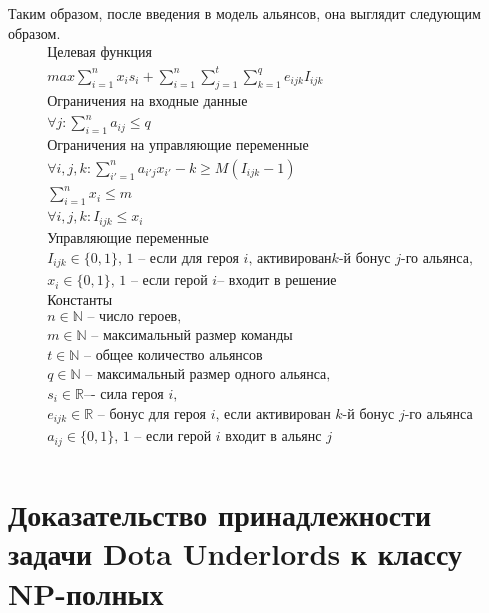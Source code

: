 \documentclass{article}
\begin{document}
Таким образом, после введения в модель альянсов, она выглядит следующим образом.
\begin{equation}
\label{eq:DUIP}
\begin{gathered}
\textbf{Целевая функция}\\
max \sum_{i=1}^{n} x_i s_i + \sum_{i=1}^{n} \sum_{j=1}^{t}  \sum_{k=1}^{q} e_{ijk} I_{ijk} \\
\textbf{Ограничения на входные данные}\\
\forall{j} : \sum_{i=1}^n a_{ij} \le q \\
\textbf{Ограничения на управляющие переменные} \\
\forall{i,j,k} :  \sum_{i'=1}^{n} a_{i'j} x_{i'} - k \ge M( I_{ijk}  - 1) \\
\sum_{i=1}^n x_i \le m   \\ 
\forall{i,j,k} :  I_{ijk}  \le x_i \\
\textbf{Управляющие переменные} \\
I_{ijk} \in \{0, 1\} \text {, 1 – если для героя } i \text{, активирован} k\text{-й бонус } j \text{-го альянса,} \\
x_i  \in \{0, 1\} \text{, 1 -- если герой } i \text{– входит в решение} \\
\textbf{Константы} \\
n \in \mathbb{N} \text{ -- число героев,} \\
m \in \mathbb{N} \text{ -- максимальный размер команды}\\
t \in \mathbb{N} \text{ -- общее количество альянсов} \\
q \in \mathbb{N} \text{ -- максимальный размер одного альянса,} \\
s_i  \in \mathbb{R} \text{–- сила героя } i, \\
e_{ijk} \in \mathbb{R} \text{ -- бонус для героя } i \text{,  если активирован } k
\text{-й бонус } j \text{-го альянса} \\
a_{ij} \in \{0, 1\} \text{, 1 -- если герой } i \text{ входит в альянс } j \\ 
\end{gathered}
\end{equation}

\section{Доказательство принадлежности задачи Dota Underlords к классу NP-полных}
\label{SectionNPCompleteProof}
\end{document}
